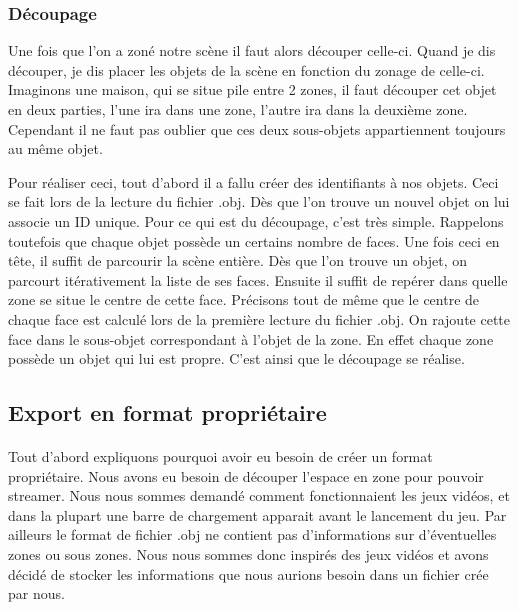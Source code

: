 \documentclass{report}
\begin{document}
			\subsubsection{Découpage}
			
			Une fois que l'on a zoné notre scène il faut alors découper celle-ci. Quand je dis découper, je dis placer les objets de la scène en fonction du zonage de celle-ci. Imaginons une maison, qui se situe pile entre 2 zones, il faut découper cet objet en deux parties, l'une ira dans une zone, l'autre ira dans la deuxième zone. Cependant il ne faut pas oublier que ces deux sous-objets appartiennent toujours au même objet.
			
			Pour réaliser ceci, tout d'abord il a fallu créer des identifiants à nos objets. Ceci se fait lors de la lecture du fichier .obj. Dès que l'on trouve un nouvel objet on lui associe un ID unique. Pour ce qui est du découpage, c'est très simple. Rappelons toutefois que chaque objet possède un certains nombre de faces. Une fois ceci en tête, il suffit de parcourir la scène entière. Dès que l'on trouve un objet, on parcourt itérativement la liste de ses faces. Ensuite il suffit de repérer dans quelle zone se situe le centre de cette face. Précisons tout de même que le centre de chaque face est calculé lors de la première lecture du fichier .obj. On rajoute cette face dans le sous-objet correspondant à l'objet de la zone. En effet chaque zone possède un objet qui lui est propre. C'est ainsi que le découpage se réalise.
			
			\subsection{Export en format propriétaire}

				\paragraph{}

Tout d'abord expliquons pourquoi avoir eu besoin de créer un format propriétaire. Nous avons eu besoin de découper l'espace en zone pour pouvoir streamer. Nous nous sommes demandé comment fonctionnaient les jeux vidéos, et dans la plupart une barre de chargement 
apparait avant le lancement du jeu. Par ailleurs le format de fichier .obj ne contient pas d'informations sur d'éventuelles zones ou sous zones. Nous nous sommes donc inspirés des jeux vidéos et avons décidé de stocker les informations que nous aurions besoin dans un fichier crée par nous.\\
				 
\end{document}
